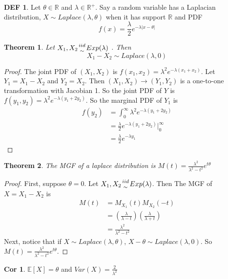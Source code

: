 \documentclass{article}
\newtheorem{theorem}{Theorem}
\theoremstyle{definition}\newtheorem{definition}{DEF}
\theoremstyle{definition}\newtheorem{example}{Ex}
\theoremstyle{lemma}\newtheorem{lemma}{Lemma}
\theoremstyle{corrolary}\newtheorem{corrolary}{Cor}
\begin{document}
\begin{definition}
Let $\theta \in \mathbb{R}$ and $\lambda \in \mathbb{R}^+$.
Say a random variable has a Laplacian distribution, $X\sim Laplace(\lambda, \theta)$ when it has support $\mathbb{R}$ and PDF
\begin{equation}
f(x)=\frac{\lambda}{2}e^{-\lambda |x-\theta |}
\end{equation}
\end{definition}

\begin{theorem}
Let $X_1, X_2 {iid \atop \sim} Exp(\lambda)$ .
Then 
\begin{equation}
X_1 -X_2\sim Laplace(\lambda, 0)
\end{equation}
\end{theorem}
\begin{proof}
The joint PDF of $(X_1, X_2)$ is $f(x_1, x_2)= \lambda^2 e^{-\lambda (x_1+x_2)}$.
Let $Y_1=X_1-X_2$ and $Y_2=X_2$.
Then $(X_1, X_2)\rightarrow (Y_1, Y_2)$ is a one-to-one transformation with Jacobian 1.
So the joint PDF of $Y$ is $f(y_1, y_2)=\lambda^2 e^{-\lambda (y_1 + 2y_2)}$.
So the marginal PDF of $Y_1$ is
\begin{align*}
f(y_2)&=\int_0^\infty \lambda^2 e^{-\lambda (y_1 +2y_2)}\\
&=\frac{\lambda}{2}e^{-\lambda(y_1+2y_2)}|_0^\infty\\
&=\frac{\lambda}{2}e^{-\lambda y_1}
\end{align*}
\end{proof}

\begin{theorem}
The MGF of a laplace distribution is $M(t)=\frac{\lambda^2}{\lambda^2 -t^2}e^{t\theta}$
\end{theorem}
\begin{proof}
First, suppose $\theta=0$.
Let $X_1, X_2{iid \atop \sim} Exp(\lambda)$.
Then The MGF of $X=X_1-X_2$ is
\begin{align*}
M(t)&=M_{X_1}(t)M_{X_2}(-t)\\
&=\left(\frac{\lambda}{\lambda - t}\right) \left( \frac{\lambda}{\lambda + t}\right)\\
&=\frac{\lambda^2}{\lambda^2 - t^2}
\end{align*}
Next, notice that if $X\sim Laplace(\lambda, \theta)$, $X-\theta \sim Laplace(\lambda, 0)$.
So $M(t)=\frac{\lambda^2}{\lambda^2 -t^2}e^{t\theta}$.
\end{proof}
\begin{corrolary}
$\mathbb{E}[X]=\theta$ and $Var(X)=\frac{2}{\lambda^2}$
\end{corrolary}
\end{document}
